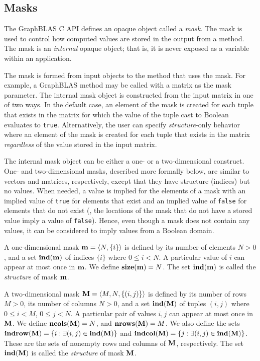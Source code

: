 \subsection{Masks}
\label{Sec:Masks}

The GraphBLAS C API defines an opaque object called a \emph{mask}.  The mask
is used to control how computed values are stored in the output from a method. 
The mask is an \emph{internal} opaque object; that is, it is never exposed as a 
variable within an application. 

The mask is formed from input objects to the method that uses 
the mask.  For example, a GraphBLAS method may be called with a matrix as the mask
parameter.   The internal mask object is constructed from the input matrix in one
of two ways.  In the default case, an element of the mask is created for each 
tuple that exists in the matrix for which the value of the tuple cast to Boolean 
evaluates to {\tt true}.  Alternatively, the user can specify {\em structure}-only 
behavior where an element of the mask is created for each tuple that exists in 
the matrix {\em regardless} of the value stored in the input matrix.

The internal mask object can be either a one- or a two-dimensional construct.  
One- and two-dimensional masks, described more formally below, are similar to
vectors and matrices, respectively, except that they have structure
(indices) but no values.  When needed, a value is implied for the elements of a 
mask with an implied value of {\tt true} for elements that exist 
and an implied value of {\tt false} for elements that do not exist (\ie,
the locations of the mask that do not have a stored value imply a value of {\tt false}).
Hence, even though a mask does not contain any values, it can be 
considered to imply values from a Boolean domain.

A one-dimensional mask ${\bf m} = \langle N, \{ i \} \rangle$ is
defined by its number of elements $N>0$, and a set $\mathbf{ind}({\bf m})$
of indices $\{ i \}$ where $0 \leq i < N$.  A particular value of $i$ can
appear at most once in ${\bf m}$. We define $\mathbf{size}({\bf m})
= N$. The set $\mathbf{ind}({\bf m})$ is called the \emph{structure} of mask ${\bf m}$.

A two-dimensional mask ${\bf M} = \langle M, N, \{ (i,j) \}
\rangle$ is defined by its number of rows $M>0$, its number of
columns $N>0$, and a set $\mathbf{ind}({\bf M})$ of tuples $(i,j)$
where $0 \leq i < M$, $0 \leq j < N$.   A particular pair of values
$i,j$ can appear at most once in ${\bf M}$.  We define
$\mathbf{ncols}({\bf M}) = N$, and $\mathbf{nrows}({\bf M}) = M$.
We also define the sets ${\bf indrow({\bf M})} = \{ i : \exists
(i,j) \in \mathbf{ind}({\bf M}) \}$ and ${\bf indcol({\bf M})}
= \{ j : \exists (i,j) \in \mathbf{ind}({\bf M}) \}$.  These are
the sets of nonempty rows and columns of ${\bf M}$, respectively.
The set $\mathbf{ind}({\bf M})$ is called the \emph{structure} of 
mask ${\bf M}$.

